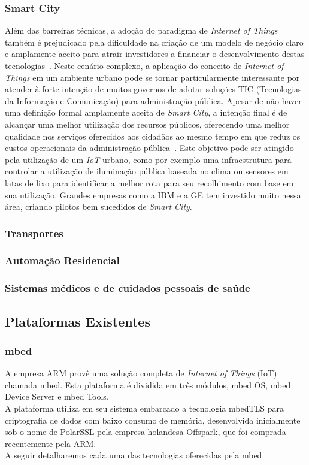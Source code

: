 \subsubsection{Smart City}
Além das barreiras técnicas, a adoção do paradigma de \textit{Internet of Things} também é prejudicado
pela dificuldade na criação de um modelo de negócio claro e amplamente aceito para atrair investidores
a financiar o desenvolvimento destas tecnologias~\cite{RePEc:zbw:itse13:88475}.
Neste cenário complexo, a aplicação do conceito de \textit{Internet of Things} em um ambiente urbano
pode se tornar particularmente interessante por atender à forte intenção de muitos governos de adotar
soluções TIC (Tecnologias da Informação e Comunicação) para administração pública.
Apesar de não haver uma definição formal amplamente aceita de \textit{Smart City}, a intenção final é de
alcançar uma melhor utilização dos recursos públicos, oferecendo uma melhor qualidade nos serviços oferecidos
aos cidadãos ao mesmo tempo em que reduz os custos operacionais da administração pública~\cite{IoTSmart2014}.
Este objetivo pode ser atingido pela utilização de um \textit{IoT} urbano, como por exemplo uma infraestrutura
para controlar a utilização de iluminação pública baseada no clima ou sensores em latas de lixo para
identificar a melhor rota para seu recolhimento com base em sua utilização. Grandes empresas como a
IBM e a GE tem investido muito nessa área, criando pilotos bem sucedidos de \textit{Smart City}.

\subsubsection{Transportes}
\subsubsection{Automação Residencial}
\subsubsection{Sistemas médicos e de cuidados pessoais de saúde}

\subsection{Plataformas Existentes}
\label{sec:IoTPlataformas}

\subsubsection{mbed}
A empresa ARM provê uma solução completa de \textit{Internet of Things} (IoT) chamada mbed\cite{mbed}. Esta plataforma é dividida em três módulos, mbed OS, mbed Device Server e mbed Tools.\\
A plataforma utiliza em seu sistema embarcado a tecnologia mbedTLS para criptografia de dados com baixo consumo de memória, desenvolvida inicialmente sob o nome de PolarSSL pela empresa holandesa Offspark, que foi comprada recentemente pela ARM.\\
A seguir detalharemos cada uma das tecnologias oferecidas pela mbed.\\

